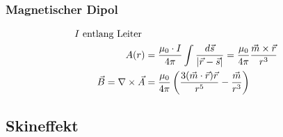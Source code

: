 \subsubsection{Magnetischer Dipol}


\begin{align*}
    I\textnormal{ entlang Leiter }                                                                                                                                        \\
    A(r)                            & = \frac{\mu_0 \cdot I}{4 \pi} \int \frac{d \vec{s}}{| \vec{r} - \vec{s}|} = \frac{ \mu_0}{4 \pi} \frac{\vec{m} \times \vec{r}}{r^3} \\
    \vec{B} = \nabla \times \vec{A} & = \frac{\mu_0}{4 \pi} \left(\frac{3(\vec{m} \cdot \vec{r})\vec{r}}{r^5} - \frac{\vec{m}}{r^3}\right)
\end{align*}
\subsection{Skineffekt}



